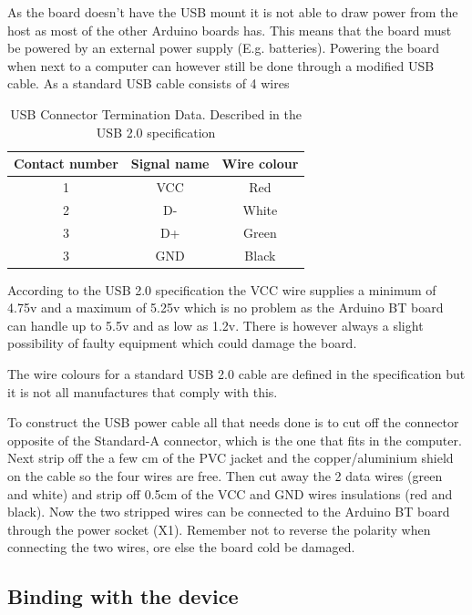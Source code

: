 \documentclass[a4paper, oneside, final]{memoir}
\begin{document}
As the board doesn't have the USB mount it is not able to draw power from the
host as most of the other Arduino boards has. This means that the board must be
powered by an external power supply (E.g. batteries). Powering the board when
next to a computer can however still be done through a modified USB cable. As a
standard USB cable consists of 4 wires

\begin{table}[h!]
  \centering
  \begin{tabular}{|c|c|c|}
    \hline
    Contact number & Signal name & Wire colour \\ \hline
    1 & VCC & Red \\ \hline
    2 & D- & White \\ \hline
    3 & D+ & Green \\ \hline
    3 & GND & Black \\ \hline
  \end{tabular}
  \caption{USB Connector Termination Data. Described in the USB 2.0
    specification \cite[Table 6-1 ``USB Connector Termination Assignment'']{usb20} }
  \label{tab:ArduinoBT:Connector_Termination_Data}
\end{table}

According to the USB 2.0 specification \cite[Table 7-7 ``DC Electrical
Characteristics'']{usb20} the VCC wire supplies a minimum of 4.75v and a maximum of
5.25v which is no problem as the Arduino BT board can handle up to 5.5v and as
low as 1.2v. There is however always a slight possibility of faulty equipment
which could damage the board.

The wire colours for a standard USB 2.0 cable are defined in the
specification \cite[Figure 6-2 ``USB Standard Detachable Cable Assembly'']{usb20}
but it is not all manufactures that comply with this.

To construct the USB power cable all that needs done is to cut off the connector
opposite of the Standard-A connector, which is the one that fits in the
computer. Next strip off the a few cm of the PVC jacket and the copper/aluminium
shield on the cable so the four wires are free. Then cut away the 2 data wires
(green and white) and strip off 0.5cm of the VCC and GND wires insulations (red
and black). Now the two stripped wires can be connected to the Arduino BT board
through the power socket (X1). Remember not to reverse the polarity when
connecting the two wires, ore else the board cold be damaged.

\subsection{Binding with the device}
\end{document}
